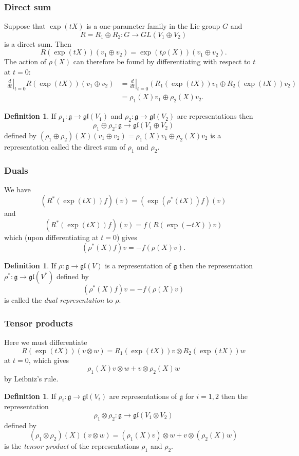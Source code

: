 \documentclass[12pt]{article}
\theoremstyle{definition}
\newtheorem{dfn}[thm]{Definition}
\theoremstyle{check}
\theoremstyle{remark}
\theoremstyle{TheoremNum}
\begin{document}
\subsubsection{Direct sum}

Suppose that $\exp(tX)$ is a one-parameter family in the Lie group $G$ and
\[R=R_1\oplus R_2\colon G\to GL(V_1\oplus V_2)\]
is a direct sum. Then
\[R(\exp(tX))(v_1\oplus v_2)=\exp(t\rho(X))(v_1\oplus v_2).\]
The action of $\rho(X)$ can therefore be found by differentiating with respect to $t$ at $t=0$:
\begin{align*}
\left.\frac{d}{dt}\right|_{t=0}R(\exp(tX))(v_1\oplus v_2)&=\left.\frac{d}{dt}\right|_{t=0}\left(R_1(\exp(tX))v_1\oplus R_2(\exp(tX))v_2\right)\\
&=\rho_1(X)v_1\oplus\rho_2(X)v_2.
\end{align*}
\begin{dfn}
If $\rho_1\colon\mathfrak{g}\to\mathfrak{gl}(V_1)$ and $\rho_2\colon\mathfrak{g}\to\mathfrak{gl}(V_2)$ are representations then
\[\rho_1\oplus\rho_2\colon\mathfrak{g}\to\mathfrak{gl}(V_1\oplus V_2)\]
defined by $(\rho_1\oplus\rho_2)(X)(v_1\oplus v_2)=\rho_1(X)v_1\oplus\rho_2(X)v_2$ is a representation called the direct sum of $\rho_1$ and $\rho_2$.
\end{dfn}

\subsubsection{Duals}

We have
\[\left(R^*(\exp(tX))f\right)(v)=\left(\exp(\rho^*(tX))f\right)(v)\]
and
\[\left(R^*(\exp(tX))f\right)(v)=f\left(R(\exp(-tX))v\right)\]
which (upon differentiating at $t=0$) gives
\[\left(\rho^*(X)f\right)v=-f(\rho(X)v).\]
\begin{dfn}
If $\rho\colon\mathfrak{g}\to\mathfrak{gl}(V)$ is a representation of $\mathfrak{g}$ then the representation $\rho^*\colon\mathfrak{g}\to\mathfrak{gl}(V^*)$ defined by
\[(\rho^*(X)f)v=-f(\rho(X)v)\]
is called the {\em dual representation} to $\rho$.
\end{dfn}

\subsubsection{Tensor products}

Here we must differentiate
\[R(\exp(tX))(v\otimes w)=R_1(\exp(tX))v\otimes R_2(\exp(tX))w\]
at $t=0$, which gives
\[\rho_1(X)v\otimes w+v\otimes\rho_2(X)w\]
by Leibniz's rule.
\begin{dfn}
If $\rho_i\colon\mathfrak{g}\to\mathfrak{gl}(V_i)$ are representations of $\mathfrak{g}$ for $i=1,2$ then the representation
\[\rho_1\otimes\rho_2\colon\mathfrak{g}\to\mathfrak{gl}(V_1\otimes V_2)\]
defined by
\[(\rho_1\otimes\rho_2)(X)(v\otimes w)=(\rho_1(X)v)\otimes w+v\otimes(\rho_2(X)w)\]
is the {\em tensor product} of the representations $\rho_1$ and $\rho_2$.
\end{dfn}
\end{document}
